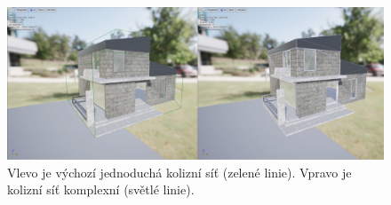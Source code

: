 \documentclass[a4paper, 12pt]{report}
\begin{document}
\begin{figure}[h!]
	\centering
	\includegraphics[width=16cm]{Collision.jpg}
	\caption{Vlevo je výchozí jednoduchá kolizní síť (zelené linie). Vpravo je kolizní síť komplexní (světlé linie). }
\end{figure}
\end{document}
